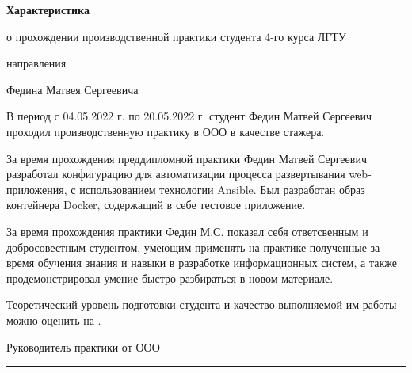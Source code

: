 \documentclass{gost}
\begin{document}
  \begin{center}
    {\bfseries Характеристика}

    о прохождении производственной практики студента 4-го курса ЛГТУ

    направления


    Федина Матвея Сергеевича
  \\[\baselineskip]
  \end{center}

  В период с 04.05.2022 г. по 20.05.2022 г. студент Федин Матвей Сергеевич
  проходил производственную практику в ООО  в качестве
  стажера.

  За время прохождения преддипломной практики Федин Матвей Сергеевич разработал
  конфигурацию для автоматизации процесса развертывания web-приложения,
  с использованием технологии Ansible. Был разработан образ контейнера Docker,
  содержащий в себе тестовое приложение.

  За время прохождения практики Федин М.С. показал себя ответсвенным и
  добросовестным студентом, умеющим применять на практике полученные за время
  обучения знания и навыки в разработке информационных систем, а также
  продемонстрировал умение быстро разбираться в новом материале.

  Теоретический уровень подготовки студента и качество выполняемой им работы
  можно оценить на .

  \vfill
  \noindent
  Руководитель практики от ООО \\[\baselineskip]
  \rule{10cm}{1pt}
\end{document}
